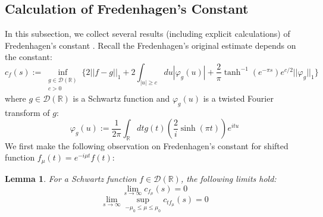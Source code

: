 \documentclass[a4paper,11pt]{article}
\newtheorem{lemma}[theorem]{Lemma}
\theoremstyle{definition}
\newcommand{\lb}{\left(}
\newcommand{\rb}{\right)}
\begin{document}
\subsection{Calculation of Fredenhagen's Constant}\label{subsection:gaussiansmear}
In this subsection, we collect several results (including explicit calculations) of Fredenhagen's constant \cite{fredenhagen}. Recall the Fredenhagen's original estimate depends on the constant:
\begin{equation}
    c_f(s):=\inf_{\substack{g\in\mathcal{D}(\mathbb{R})\\ c > 0}}\{2||f - g||_1 + 2\int_{|u|\geq c}du|\varphi_g(u)| + \frac{2}{\pi}\tanh^{-1}(e^{-\pi s})e^{c/2}||\varphi_g||_1\}
\end{equation}
where $g\in\mathcal{D}(\mathbb{R})$ is a Schwartz function and $\varphi_g(u)$ is  a twisted Fourier transform of $g$:
\begin{equation}
    \varphi_g(u):=\frac{1}{2\pi}\int_\mathbb{R} dt g(t)\lb\frac{2}{i}\sinh(\pi t)\rb e^{itu}
\end{equation}
We first make the following observation on Fredenhagen's constant for shifted function $f_\mu(t) = e^{-i\mu t}f(t)$:
\begin{lemma}\label{lemma:shiftedfredenhagenconstant}
    For a Schwartz function $f\in \mathcal{D}(\mathbb{R})$, the following limits hold:
    \begin{equation}
        \lim_{s\rightarrow\infty}c_{f_\mu}(s) = 0
    \end{equation}
    \begin{equation}
        \lim_{s\rightarrow\infty}\sup_{-\mu_0\leq \mu\leq\mu_0}c_{tf_\mu}(s) = 0
    \end{equation}
\end{lemma}
\end{document}

